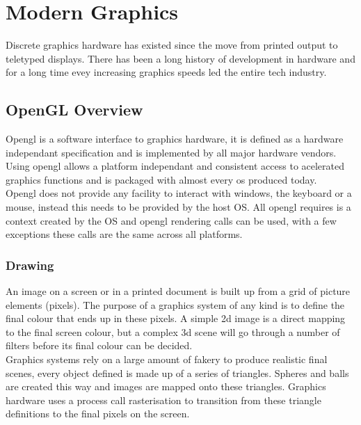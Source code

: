\section{Modern Graphics}

Discrete graphics hardware has existed since the move from printed output to 
teletyped displays. There has been a long history of development in hardware and
for a long time evey increasing graphics speeds led the entire tech industry.\\

\subsection{OpenGL Overview} 
Opengl is a software interface to graphics hardware, it is defined as a hardware
independant specification and is implemented by all major hardware vendors.
Using opengl allows a platform independant and consistent access to acelerated 
graphics functions and is packaged with almost every os produced today.\\

Opengl does not provide any facility to interact with windows, the keyboard or a 
mouse, instead this needs to be provided by the host OS. All opengl requires is 
a context created by the OS and opengl rendering calls can be used, with a few 
exceptions these calls are the same across all platforms.\\

\subsubsection*{Drawing}

An image on a screen or in a printed document is built up from a grid of picture
elements (pixels). The purpose of a graphics system of any kind is to define the
final colour that ends up in these pixels. A simple 2d image is a direct mapping
to the final screen colour, but a complex 3d scene will go through a number of 
filters before its final colour can be decided. \\

Graphics systems rely on a large amount of fakery to produce realistic final 
scenes, every object defined is made up of a series of triangles. Spheres and
balls are created this way and images are mapped onto these triangles. Graphics
hardware uses a process call rasterisation to transition from these triangle 
definitions to the final pixels on the screen.\\

